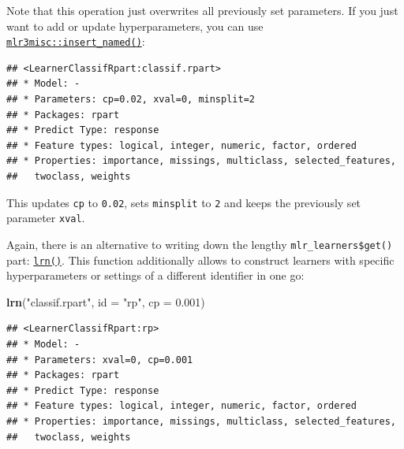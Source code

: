 \documentclass[]{scrbook}
\newenvironment{Shaded}{\begin{snugshade}}{\end{snugshade}}
\newcommand{\DataTypeTok}[1]{\textcolor[rgb]{0.13,0.29,0.53}{#1}}
\newcommand{\DecValTok}[1]{\textcolor[rgb]{0.00,0.00,0.81}{#1}}
\newcommand{\FloatTok}[1]{\textcolor[rgb]{0.00,0.00,0.81}{#1}}
\newcommand{\KeywordTok}[1]{\textcolor[rgb]{0.13,0.29,0.53}{\textbf{#1}}}
\newcommand{\NormalTok}[1]{#1}
\newcommand{\OperatorTok}[1]{\textcolor[rgb]{0.81,0.36,0.00}{\textbf{#1}}}
\newcommand{\StringTok}[1]{\textcolor[rgb]{0.31,0.60,0.02}{#1}}
\renewenvironment{Shaded} {\begin{snugshade}\small} {\end{snugshade}}
\begin{document}
Note that this operation just overwrites all previously set parameters.
If you just want to add or update hyperparameters, you can use \href{https://mlr3misc.mlr-org.com/reference/insert_named.html}{\texttt{mlr3misc::insert\_named()}}:

\begin{Shaded}
\end{Shaded}

\begin{verbatim}
## <LearnerClassifRpart:classif.rpart>
## * Model: -
## * Parameters: cp=0.02, xval=0, minsplit=2
## * Packages: rpart
## * Predict Type: response
## * Feature types: logical, integer, numeric, factor, ordered
## * Properties: importance, missings, multiclass, selected_features,
##   twoclass, weights
\end{verbatim}

This updates \texttt{cp} to \texttt{0.02}, sets \texttt{minsplit} to \texttt{2} and keeps the previously set parameter \texttt{xval}.

Again, there is an alternative to writing down the lengthy \texttt{mlr\_learners\$get()} part: \href{https://mlr3.mlr-org.com/reference/mlr_sugar.html}{\texttt{lrn()}}.
This function additionally allows to construct learners with specific hyperparameters or settings of a different identifier in one go:

\begin{Shaded}
\begin{Highlighting}[]
\KeywordTok{lrn}\NormalTok{(}\StringTok{"classif.rpart"}\NormalTok{, }\DataTypeTok{id =} \StringTok{"rp"}\NormalTok{, }\DataTypeTok{cp =} \FloatTok{0.001}\NormalTok{)}
\end{Highlighting}
\end{Shaded}

\begin{verbatim}
## <LearnerClassifRpart:rp>
## * Model: -
## * Parameters: xval=0, cp=0.001
## * Packages: rpart
## * Predict Type: response
## * Feature types: logical, integer, numeric, factor, ordered
## * Properties: importance, missings, multiclass, selected_features,
##   twoclass, weights
\end{verbatim}
\end{document}
